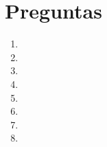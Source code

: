 \documentclass[11pt]{article}
\begin{document}



\section*{Preguntas}

\begin{enumerate}
    \item  \medskip

    \item  \medskip

    \item  \medskip

    \item  \medskip

    \item  \medskip

    \item  \medskip

    \item  \medskip

    \item 
\end{enumerate}
\thispagestyle{empty}
\end{document}
